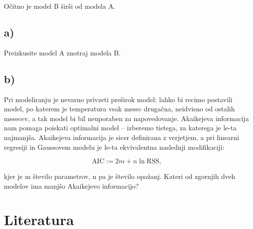 \documentclass[12pt, a4paper]{article}
\begin{document}
Očitno je model B širši od modela A.

\subsection{a)}

Preizkusite model A znotraj modela B.

\subsection{b)}
Pri modeliranju je nevarno privzeti preširok model: lahko bi recimo postavili
model, po katerem je temperatura vsak mesec drugačna, neidvisno od ostalih
mesecev, a tak model bi bil neuporaben za napovedovanje. Akaikejeva 
informacija nam pomaga poiskati optimalni model – izberemo tistega, za katerega
je le-ta najmanjša. Akaikejeva informacija je sicer definirana z verjetjem, 
a pri linearni regresiji in Gaussovem modelu je le-ta ekvivalentna naslednji 
modifikaciji:

\[
    \text{AIC} := 2m + n \ln \text{RSS,}
    \]

kjer je m število parametrov, n pa je število opažanj. Kateri od zgornjih dveh
modelov ima manjšo Akaikejevo informacijo?



\section{Literatura}
\end{document}
